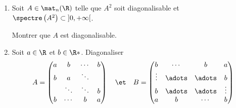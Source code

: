 \begin{enonce}
\begin{exercise}
\begin{enumerate}
  \item Soit $A\in\mat_n(\R)$ telle que $A^2$ soit diagonalisable et $\spectre\left( A^2 \right) \subset\left]0,+\infty\right[$.
    
    Montrer que $A$ est diagonalisable.

  \item Soit $a\in\R$ et $b\in\R*$.
    Diagonaliser
    \begin{equation*}
      A = \begin{pmatrix} 
      a & b & \cdots & b\\ 
      b & a & \ddots\\
        & \ddots & \ddots & b\\
      b &\cdots & b & a
      \end{pmatrix} 
      \quad\et\quad
      B = \begin{pmatrix} 
        b & \cdots & b & a\\
        \vdots & \adots & \adots & b\\
        b & \adots & \adots & \vdots\\
        a & b & \cdots & b
      \end{pmatrix} 
    \end{equation*}
\end{enumerate}
\end{exercise}
\begin{solution}
\end{solution}
\end{enonce}
